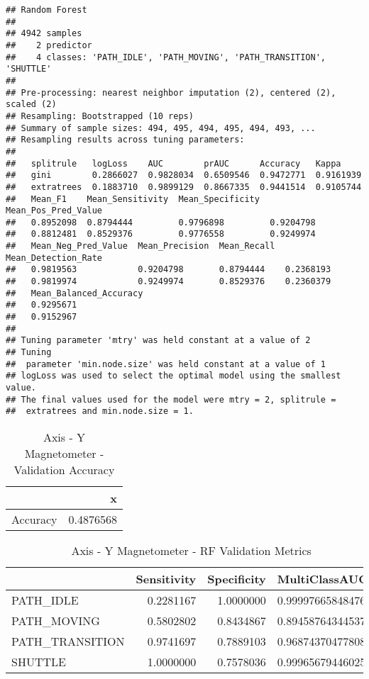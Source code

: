 \documentclass[]{article}
\begin{document}
\begin{verbatim}
## Random Forest 
## 
## 4942 samples
##    2 predictor
##    4 classes: 'PATH_IDLE', 'PATH_MOVING', 'PATH_TRANSITION', 'SHUTTLE' 
## 
## Pre-processing: nearest neighbor imputation (2), centered (2), scaled (2) 
## Resampling: Bootstrapped (10 reps) 
## Summary of sample sizes: 494, 495, 494, 495, 494, 493, ... 
## Resampling results across tuning parameters:
## 
##   splitrule   logLoss    AUC        prAUC      Accuracy   Kappa    
##   gini        0.2866027  0.9828034  0.6509546  0.9472771  0.9161939
##   extratrees  0.1883710  0.9899129  0.8667335  0.9441514  0.9105744
##   Mean_F1    Mean_Sensitivity  Mean_Specificity  Mean_Pos_Pred_Value
##   0.8952098  0.8794444         0.9796898         0.9204798          
##   0.8812481  0.8529376         0.9776558         0.9249974          
##   Mean_Neg_Pred_Value  Mean_Precision  Mean_Recall  Mean_Detection_Rate
##   0.9819563            0.9204798       0.8794444    0.2368193          
##   0.9819974            0.9249974       0.8529376    0.2360379          
##   Mean_Balanced_Accuracy
##   0.9295671             
##   0.9152967             
## 
## Tuning parameter 'mtry' was held constant at a value of 2
## Tuning
##  parameter 'min.node.size' was held constant at a value of 1
## logLoss was used to select the optimal model using the smallest value.
## The final values used for the model were mtry = 2, splitrule =
##  extratrees and min.node.size = 1.
\end{verbatim}

\begin{table}[!h]

\caption{\label{tab:sensor-y-mag-rf-results}Axis - Y Magnetometer - Validation Accuracy}
\centering
\begin{tabular}[t]{lr}
\toprule
  & x\\
\midrule
Accuracy & 0.4876568\\
\bottomrule
\end{tabular}
\end{table}

\begin{table}[!h]

\caption{\label{tab:sensor-y-mag-rf-results}Axis - Y Magnetometer - RF Validation Metrics}
\centering
\begin{tabular}[t]{lrrl}
\toprule
  & Sensitivity & Specificity & MultiClassAUC\\
\midrule
PATH\_IDLE & 0.2281167 & 1.0000000 & 0.999976658484764\\
PATH\_MOVING & 0.5802802 & 0.8434867 & 0.894587643445371\\
PATH\_TRANSITION & 0.9741697 & 0.7889103 & 0.968743704778088\\
SHUTTLE & 1.0000000 & 0.7578036 & 0.999656794460259\\
\bottomrule
\end{tabular}
\end{table}
\end{document}
